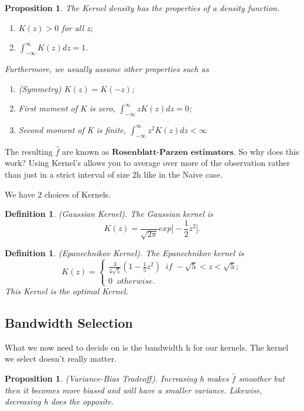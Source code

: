 \documentclass[twoside]{article}
\newtheorem{proposition}[theorem]{Proposition}
\newtheorem{definition}[theorem]{Definition}
\begin{document}
\begin{proposition}The Kernel density has the properties of a density function.
\begin{enumerate}
    \item $K(z) > 0$ for all z;
    \item $\int_{-\infty}^{\infty}K(z)dz = 1$.
\end{enumerate}

Furthermore, we usually assume other properties such as 
\begin{enumerate}
    \item (Symmetry) $K(z) = K(-z)$;
    \item First moment of K is zero, $\int_{-\infty}^{\infty}zK(z)dz = 0$;
    \item Second moment of K is finite, $\int_{-\infty}^{\infty}z^2K(z)dz < \infty$
\end{enumerate}
\end{proposition}

The resulting $\hat{f}$ are known as $\textbf{Rosenblatt-Parzen estimators}$. So why does this work? Using Kernel's allows you to average over more of the observation rather than just in a strict interval of size 2h like in the Naive case.

We have 2 choices of Kernels.

\begin{definition}(Gaussian Kernel). The Gaussian kernel is
$$
K(z) = \frac{}{\sqrt{2\pi}}exp\big[-\frac{1}{2}z^2\big].
$$
\end{definition}

\begin{definition}(Epanechnikov Kernel). The Epanechnikov kernel is
$$K(z) = 
\begin{cases}
    \frac{3}{4\sqrt{5}}(1 - \frac{1}{5}z^2) \;\; if \; -\sqrt{5} < z < \sqrt{5}; \\ 
    0 \;\; otherwise.
\end{cases}
$$
This Kernel is the optimal Kernel.
\end{definition}

\subsection{Bandwidth Selection}

What we now need to decide on is the bandwidth h for our kernels. The kernel we select doesn't really matter.

\begin{proposition}(Variance-Bias Tradeoff). Increasing h makes $\hat{f}$ smoother but then it becomes more biased and will have a smaller variance. Likewise, decreasing h does the opposite.
\end{proposition}
\end{document}
